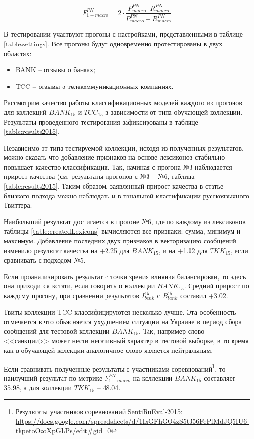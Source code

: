 \begin{equation}
    \label{eq:fmacro12}
    F_{1-macro}^{PN} = 2 \cdot \dfrac{P_{macro}^{PN} \cdot
        R_{macro}^{PN}}{P_{macro}^{PN} + R_{macro}^{PN}}
\end{equation}

В тестировании участвуют прогоны с настройками, представленными в таблице
\ref{table:settings}.
Все прогоны будут одновременно протестированы в двух областях:
\begin{itemize}
    \item BANK -- отзывы о банках;
    \item TCC -- отзывы о телекоммуникационных компаниях.
\end{itemize}



Рассмотрим качество работы классификационных моделей каждого из прогонов для
коллекций $BANK_{15}$ и $TCC_{15}$ в зависимости от типа обучающей коллекции.
Результаты проведенного тестирования зафиксированы в таблице \ref{table:results2015}.



Независимо от типа тестируемой коллекции, исходя из полученных результатов,
можно сказать что добавление признаков на основе лексиконов стабильно
повышает качество классификации.
Так, начиная с прогона №3 наблюдается прирост качества (см. результаты
прогонов с №3 -- №6, таблица \ref{table:results2015}.
Таким образом, заявленный прирост качества в статье близкого подхода
\cite{modernApproach} можно наблюдать и в тональной классификации русскоязычного
Твиттера.

Наибольший результат достигается в прогоне №6, где по каждому из лексиконов таблицы
\ref{table:createdLexicons} вычисляются все признаки: сумма, минимум и максимум.
Добавление последних двух признаков в векторизацию сообщений изменило
результат качества на +2.25 для $BANK_{15}$, и на +1.02 для $TKK_{15}$, если
сравнивать с подходом №5.

Если проанализировать результат с точки зрения влияния балансировки, то
здесь она приходится кстати, если говорить о коллекции $BANK_{15}$.
Средний прирост по каждому прогону, при сравнении результатов $I_{bank}^{15}$
с $B_{bank}^{15}$ составил +3.02.

Твиты коллекции TCC классифицируются несколько лучше. Эта особенность
отмечается в \cite{tonalityAnalysis} что объясняется ухудшением ситуации на
Украине в период сбора сообщений для тестовой коллекции $BANK_{15}$.
Так, например слово <<санкции>> может нести негативный характер в тестовой
выборке, в то время как в обучающей колекции аналогичное слово является
нейтральным.

Если сравнивать полученные результаты с участниками соревнований\footnote{
    Результаты участников соревнований SentiRuEval-2015:
    \url{https://docs.google.com/spreadsheets/d/1IxGFhGO4zS5t356FePIMdJQ5IU6-tkpetoOzoXpGLPs/edit\#gid=0}
},
то наилучший результат по метрике $F_{1-macro}^{PN}$ на коллекции $BANK_{15}$
составляет 35.98, а для коллекции $TKK_{15}$ -- 48.04.
